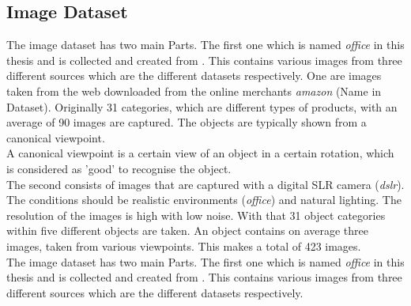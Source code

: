 \subsection{Image Dataset}\label{EmSubSecIm}
\begin{table}[]
	\centering
	\caption[Overview of key values of Image dataset]{Overview of the key figures of the Image dataset}
	\label{TableSumImage}
\end{table}
The image dataset has two main Parts. 
The first one which is named \textit{office} in this thesis and is collected and created from \cite{Saenko.2010}.
This contains various images from three different sources which are the different datasets respectively.
One are images taken from the web downloaded from the online merchants \textit{amazon} (Name in Dataset).
Originally 31 categories, which are different types of products, with an average of 90 images are captured.
The objects are typically shown from a canonical viewpoint.\\
A canonical viewpoint is a certain view of an object in a certain rotation, which is considered as 'good' to recognise the object. \cite{Edelman.1991}\\
The second consists of images that are captured with a digital SLR camera (\textit{dslr}).
The conditions should be realistic environments (\textit{office}) and natural lighting.
The resolution of the images is high with low noise.
With that 31 object categories within five different objects are taken.
An object contains on average three images, taken from various viewpoints.
This makes a total of 423 images.\\
The image dataset has two main Parts. 
The first one which is named \textit{office} in this thesis and is collected and created from \cite{Saenko.2010}.
This contains various images from three different sources which are the different datasets respectively.
